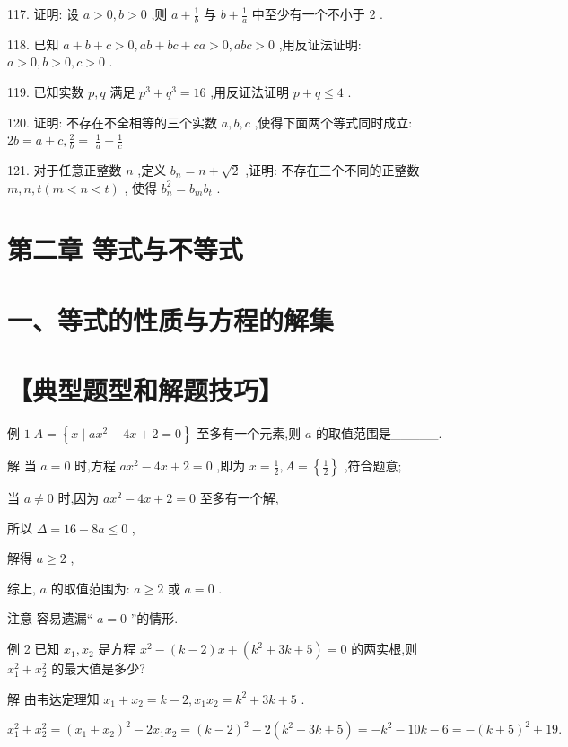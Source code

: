 \documentclass[10pt]{article}
\begin{document}
117. 证明: 设 \(a > 0,b > 0\) ,则 \(a + \frac{1}{b}\) 与 \(b + \frac{1}{a}\) 中至少有一个不小于 2 .

118. 已知 \(a + b + c > 0,{ab} + {bc} + {ca} > 0,{abc} > 0\) ,用反证法证明: \(a > 0,b > 0,c > 0\) .

119. 已知实数 \(p,q\) 满足 \({p}^{3} + {q}^{3} = {16}\) ,用反证法证明 \(p + q \leq  4\) .

120. 证明: 不存在不全相等的三个实数 \(a,b,c\) ,使得下面两个等式同时成立: \({2b} = a + c,\frac{2}{b} = \; \frac{1}{a} + \frac{1}{c}\)

121. 对于任意正整数 \(n\) ,定义 \({b}_{n} = n + \sqrt{2}\) ,证明: 不存在三个不同的正整数 \(m,n,t\left( {m < n < t}\right)\) , 使得 \({b}_{n}^{2} = {b}_{m}{b}_{t}\) .

\section*{第二章 等式与不等式}

\section*{一、等式的性质与方程的解集}

\section*{【典型题型和解题技巧】}

例 \(1\;A = \left\{  {x \mid  a{x}^{2} - {4x} + 2 = 0}\right\}\) 至多有一个元素,则 \(a\) 的取值范围是\_\_\_\_\_.

解 当 \(a = 0\) 时,方程 \(a{x}^{2} - {4x} + 2 = 0\) ,即为 \(x = \frac{1}{2},A = \left\{  \frac{1}{2}\right\}\) ,符合题意;

当 \(a \neq  0\) 时,因为 \(a{x}^{2} - {4x} + 2 = 0\) 至多有一个解,

所以 \(\Delta  = {16} - {8a} \leq  0\) ,

解得 \(a \geq  2\) ,

综上, \(a\) 的取值范围为: \(a \geq  2\) 或 \(a = 0\) .

注意 容易遗漏“ \(a = 0\) ”的情形.

例 2 已知 \({x}_{1},{x}_{2}\) 是方程 \({x}^{2} - \left( {k - 2}\right) x + \left( {{k}^{2} + {3k} + 5}\right)  = 0\) 的两实根,则 \({x}_{1}^{2} + {x}_{2}^{2}\) 的最大值是多少?

解 由韦达定理知 \({x}_{1} + {x}_{2} = k - 2,{x}_{1}{x}_{2} = {k}^{2} + {3k} + 5\) .

\({x}_{1}^{2} + {x}_{2}^{2} = {\left( {x}_{1} + {x}_{2}\right) }^{2} - 2{x}_{1}{x}_{2} = {\left( k - 2\right) }^{2} - 2\left( {{k}^{2} + {3k} + 5}\right)  =  - {k}^{2} - {10k} - 6 =  - {\left( k + 5\right) }^{2} + {19}.\)
\end{document}

